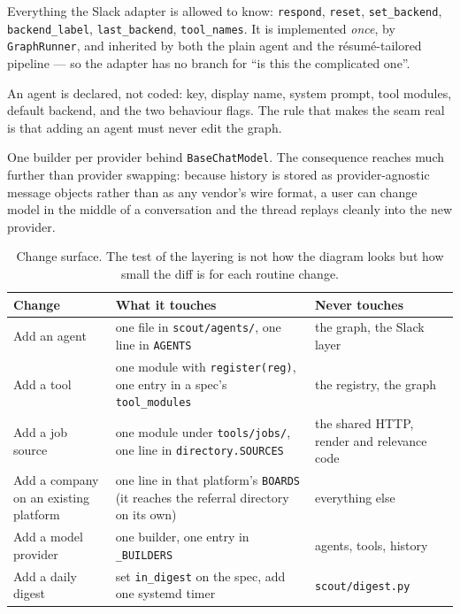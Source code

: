 \documentclass[11pt,a4paper]{article}
\newcommand{\tablefont}{\footnotesize}
\begin{document}
\begin{description}[leftmargin=0pt,style=nextline,itemsep=3pt]
  \item[Seam 1 --- \texttt{ConversationalAgent} (an ABC).] Everything the Slack adapter is
    allowed to know: \texttt{respond}, \texttt{reset}, \texttt{set\_\allowbreak{}backend},
    \texttt{backend\_\allowbreak{}label}, \texttt{last\_\allowbreak{}backend}, \texttt{tool\_\allowbreak{}names}. It is implemented
    \emph{once}, by \texttt{GraphRunner}, and inherited by both the plain agent and the
    résumé-tailored pipeline --- so the adapter has no branch for ``is this the complicated
    one''.
  \item[Seam 2 --- \texttt{AgentSpec} (a dataclass).] An agent is declared, not coded: key,
    display name, system prompt, tool modules, default backend, and the two behaviour flags.
    The rule that makes the seam real is that adding an agent must never edit the graph.
  \item[Seam 3 --- the LangChain chat model.] One builder per provider behind
    \texttt{BaseChatModel}. The consequence reaches much further than provider swapping:
    because history is stored as provider-agnostic message objects rather than as any
    vendor's wire format, a user can change model in the middle of a conversation and the
    thread replays cleanly into the new provider.
\end{description}

\begin{table}[!ht]
\centering\tablefont
\caption{Change surface. The test of the layering is not how the diagram looks but how
small the diff is for each routine change.}
\label{tab:blast}
\begin{tabularx}{\textwidth}{L{4.1cm} X L{3.0cm}}
\toprule
\textbf{Change} & \textbf{What it touches} & \textbf{Never touches} \\
\midrule
Add an agent & one file in \texttt{scout/agents/}, one line in \texttt{AGENTS} & the graph,
  the Slack layer \\
Add a tool & one module with \texttt{register(reg)}, one entry in a spec's
  \texttt{tool\_\allowbreak{}modules} & the registry, the graph \\
Add a job source & one module under \texttt{tools/jobs/}, one line in
  \texttt{directory.SOURCES} & the shared HTTP, render and relevance code \\
Add a company on an existing platform & one line in that platform's \texttt{BOARDS} (it
  reaches the referral directory on its own) & everything else \\
Add a model provider & one builder, one entry in \texttt{\_\allowbreak{}BUILDERS} & agents, tools,
  history \\
Add a daily digest & set \texttt{in\_\allowbreak{}digest} on the spec, add one systemd timer &
  \texttt{scout/digest.py} \\
\bottomrule
\end{tabularx}
\end{table}
\end{document}
